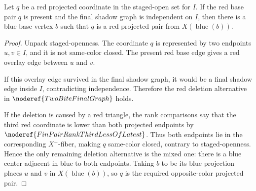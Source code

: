 \begin{lemma}
Let \(q\) be a red projected coordinate in the staged-open set for \(I\).
If the red base pair \(q\) is present and the final shadow graph is
independent on \(I\), then there is a blue base vertex \(b\) such that
\(q\) is a red projected pair from
\(X(\operatorname{blue}(b))\).
\end{lemma}
\begin{proof}
Unpack staged-openness. The coordinate \(q\) is represented by two
endpoints \(u,v\in I\), and it is not same-color closed. The present red
base edge gives a red overlay edge between \(u\) and \(v\).

If this overlay edge survived in the final shadow graph, it would be a
final shadow edge inside \(I\), contradicting independence. Therefore the
red deletion alternative in \(\noderef{TwoBiteFinalGraph}\) holds.

If the deletion is caused by a red triangle, the rank comparisons say that
the third red coordinate is lower than both projected endpoints by
\(\noderef{FinPairRankThirdLessOfLatest}\). Thus both endpoints lie in the
corresponding \(X^+\)-fiber, making \(q\) same-color closed, contrary to
staged-openness. Hence the only remaining deletion alternative is the
mixed one: there is a blue center adjacent in blue to both endpoints.
Taking \(b\) to be its blue projection places \(u\) and \(v\) in
\(X(\operatorname{blue}(b))\), so \(q\) is the required opposite-color
projected pair.
\end{proof}
